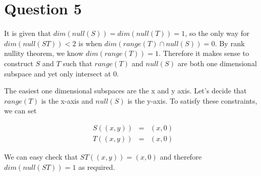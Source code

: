 \section*{Question 5}
It is given that $ dim(null(S)) = dim(null(T)) = 1 $, so the only way for $ dim(null(ST)) < 2 $ is when $ dim(range(T) \cap null(S)) = 0 $. By rank nullity theorem, we know $ dim(range(T)) = 1 $. Therefore it makes sense to construct $ S $ and $ T $ such that $ range(T) $ and $ null(S) $ are both one dimensional subspace and yet only intersect at 0.

The easiest one dimensional subspaces are the x and y axis. Let's decide that $ range(T) $ is the x-axis and $ null(S) $ is the y-axis. To satisfy these constraints, we can set

\begin{eqnarray*}
  S((x,y)) &=& (x,0) \\
  T((x,y)) &=& (x,0)
\end{eqnarray*}

We can easy check that $ ST((x,y)) = (x,0) $ and therefore $ dim(null(ST)) = 1 $ as required.